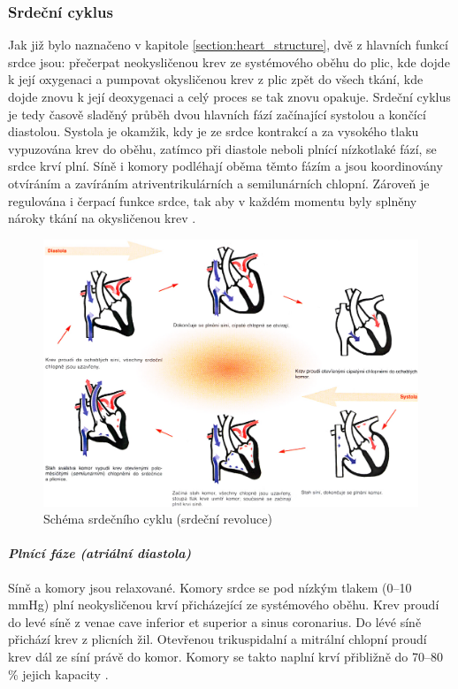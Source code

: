 \subsubsection{Srdeční cyklus}
\label{section:cardiac_cycle}
Jak již bylo naznačeno v kapitole \ref{section:heart_structure}, dvě z hlavních
funkcí srdce jsou: přečerpat neokysličenou krev ze systémového oběhu do plic,
kde dojde k její oxygenaci a pumpovat okysličenou krev z plic zpět do všech
tkání, kde dojde znovu k její deoxygenaci a celý proces se tak znovu opakuje.
Srdeční cyklus je tedy časově sladěný průběh dvou hlavních fází začínající
systolou a končící diastolou. Systola je okamžik, kdy je ze srdce kontrakcí a za
vysokého tlaku vypuzována krev do oběhu, zatímco při diastole neboli plnící
nízkotlaké fází, se srdce krví plní. Síně i komory podléhají oběma těmto fázím a
jsou koordinovány otvíráním a zavíráním atriventrikulárních a semilunárních
chlopní. Zároveň je regulována i čerpací funkce srdce, tak aby v každém momentu
byly splněny nároky tkání na okysličenou krev
\cite{OpenStax,Weinhaus2005}.

\begin{figure}[h]
	\begin{center}
		\includegraphics[width=1\textwidth]{../assets/anatomy/cardiac_cycle}
		\caption{Schéma srdečního cyklu (srdeční revoluce) \cite{Trojan2002}}
		\label{img:cardiac_cycle}
	\end{center}
\end{figure}

\paragraph*{\textit{Plnící fáze (atriální diastola)}\\} Síně a komory jsou
relaxované. Komory srdce se pod nízkým tlakem (0--10 \si{\mmHg}) plní neokysličenou
krví přicházející ze systémového oběhu. Krev proudí do levé síně z venae cave
inferior et superior a sinus coronarius. Do lévé síně přichází krev z plicních
žil. Otevřenou trikuspidalní a mitrální chlopní proudí krev dál ze síní právě do
komor. Komory se takto naplní krví přibližně do 70--80 \% jejich kapacity
\cite{OpenStax}.

